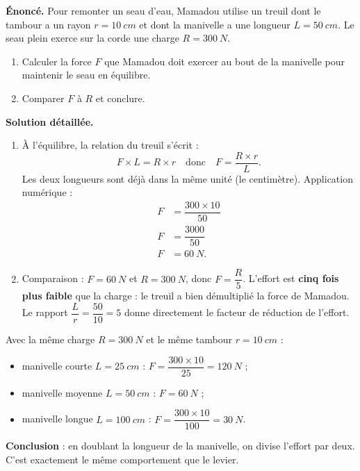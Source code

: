 \documentclass[11pt]{article}
\begin{document}
\begin{exoresolu}
\textbf{Énoncé.} Pour remonter un seau d'eau, Mamadou utilise un treuil dont le tambour a un rayon $r = \SI{10}{cm}$ et dont la manivelle a une longueur $L = \SI{50}{cm}$. Le seau plein exerce sur la corde une charge $R = \SI{300}{N}$.
\begin{enumerate}
\item Calculer la force $F$ que Mamadou doit exercer au bout de la manivelle pour maintenir le seau en équilibre.
\item Comparer $F$ à $R$ et conclure.
\end{enumerate}
\tcblower
\textbf{Solution détaillée.}
\begin{enumerate}
\item À l'équilibre, la relation du treuil s'écrit :
\[ F \times L = R \times r \quad \text{donc} \quad F = \dfrac{R \times r}{L}. \]
Les deux longueurs sont déjà dans la même unité (le centimètre). Application numérique :
\begin{align*}
F &= \dfrac{300 \times 10}{50} \\
F &= \dfrac{3000}{50} \\
F &= \SI{60}{N}.
\end{align*}
\item Comparaison : $F = \SI{60}{N}$ et $R = \SI{300}{N}$, donc $F = \dfrac{R}{5}$. L'effort est \textbf{cinq fois plus faible} que la charge : le treuil a bien démultiplié la force de Mamadou. Le rapport $\dfrac{L}{r} = \dfrac{50}{10} = 5$ donne directement le facteur de réduction de l'effort.
\end{enumerate}
\end{exoresolu}

\begin{exemplebox}
Avec la même charge $R = \SI{300}{N}$ et le même tambour $r = \SI{10}{cm}$ :
\begin{itemize}
\item manivelle courte $L = \SI{25}{cm}$ : $F = \dfrac{300 \times 10}{25} = \SI{120}{N}$ ;
\item manivelle moyenne $L = \SI{50}{cm}$ : $F = \SI{60}{N}$ ;
\item manivelle longue $L = \SI{100}{cm}$ : $F = \dfrac{300 \times 10}{100} = \SI{30}{N}$.
\end{itemize}
\textbf{Conclusion} : en doublant la longueur de la manivelle, on divise l'effort par deux. C'est exactement le même comportement que le levier.
\end{exemplebox}
\end{document}
